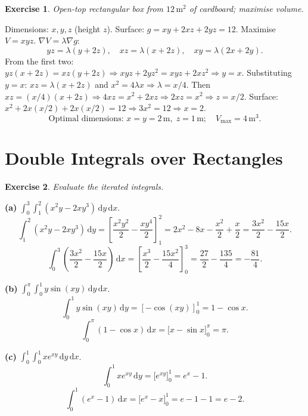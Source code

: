 \documentclass[12pt,a4paper]{article}
\theoremstyle{exstyle}
\newtheorem{exercise}{Exercise}[section]
\newcommand{\grad}{\nabla}
\newcommand{\dif}[1]{\,\mathrm{d}#1}
\begin{document}
\begin{exercise}
Open-top rectangular box from $12\,\text{m}^2$ of cardboard; maximise volume.
\end{exercise}
\begin{solbox}
Dimensions: $x,y,z$ (height $z$). Surface: $g=xy+2xz+2yz=12$.
Maximise $V=xyz$.
$\grad V=\lambda\grad g$:
\[
  yz=\lambda(y+2z),\quad xz=\lambda(x+2z),\quad xy=\lambda(2x+2y).
\]
From the first two: $yz(x+2z)=xz(y+2z)\Rightarrow xyz+2yz^2=xyz+2xz^2\Rightarrow y=x$.
Substituting $y=x$: $xz=\lambda(x+2z)$ and $x^2=4\lambda x\Rightarrow\lambda=x/4$.
Then $xz=(x/4)(x+2z)\Rightarrow4xz=x^2+2xz\Rightarrow2xz=x^2\Rightarrow z=x/2$.
Surface: $x^2+2x(x/2)+2x(x/2)=12\Rightarrow3x^2=12\Rightarrow x=2$.
\[
  \text{Optimal dimensions: }x=y=2\,\text{m},\;z=1\,\text{m};\quad V_{\max}=4\,\text{m}^3.
\]
\end{solbox}

\section{Double Integrals over Rectangles}

\begin{exercise}
Evaluate the iterated integrals.
\end{exercise}
\begin{solbox}
\textbf{(a)} $\displaystyle\int_0^3\int_1^2(x^2y-2xy^3)\dif{y}\dif{x}$.
\[
  \int_1^2(x^2y-2xy^3)\dif{y}=\left[\frac{x^2y^2}{2}-\frac{xy^4}{2}\right]_1^2
  =2x^2-8x-\frac{x^2}{2}+\frac{x}{2}=\frac{3x^2}{2}-\frac{15x}{2}.
\]
\[
  \int_0^3\left(\frac{3x^2}{2}-\frac{15x}{2}\right)\dif{x}
  =\left[\frac{x^3}{2}-\frac{15x^2}{4}\right]_0^3=\frac{27}{2}-\frac{135}{4}=-\frac{81}{4}.
\]

\textbf{(b)} $\displaystyle\int_0^\pi\int_0^1 y\sin(xy)\dif{y}\dif{x}$.
\[
  \int_0^1 y\sin(xy)\dif{y}=\left[-\cos(xy)\right]_0^1=1-\cos x.
\]
\[
  \int_0^\pi(1-\cos x)\dif{x}=\bigl[x-\sin x\bigr]_0^\pi=\pi.
\]

\textbf{(c)} $\displaystyle\int_0^1\int_0^1 xe^{xy}\dif{y}\dif{x}$.
\[
  \int_0^1 xe^{xy}\dif{y}=\bigl[e^{xy}\bigr]_0^1=e^x-1.
\]
\[
  \int_0^1(e^x-1)\dif{x}=\bigl[e^x-x\bigr]_0^1=e-1-1=e-2.
\]
\end{solbox}
\end{document}
